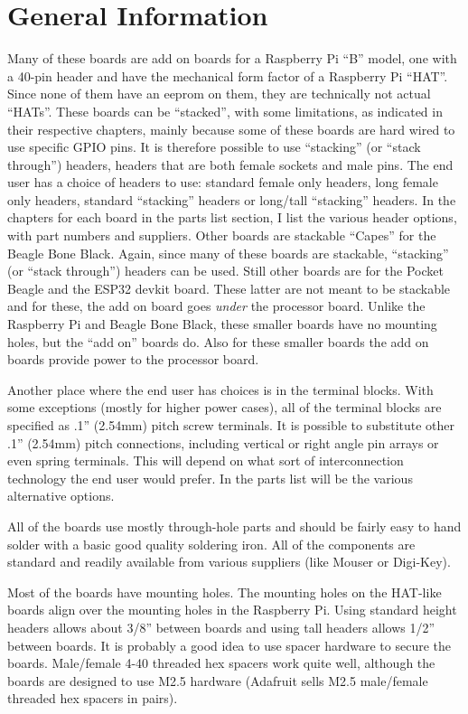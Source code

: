 \documentclass[12pt,notitlepage,twoside]{book}
\begin{document}
\cleardoublepage
{}
\chapter{General Information}

Many of these boards are add on boards for a Raspberry Pi ``B'' model, 
one with a 40-pin header and have the mechanical form factor of a Raspberry Pi 
``HAT''.  Since none of them have an eeprom on them, they are technically not 
actual ``HATs''.  These boards can be ``stacked'', with some limitations, as 
indicated in their respective chapters, mainly because some of these boards 
are hard wired to use specific GPIO pins.  It is therefore possible to use 
``stacking'' (or ``stack through'') headers, headers that are both female 
sockets and male pins.  The end user has a choice of headers to use: standard 
female only headers, long female only headers, standard ``stacking'' headers 
or long/tall ``stacking'' headers.  In the chapters for each board in the 
parts list section, I list the various header options, with part numbers and 
suppliers.  Other boards are stackable ``Capes'' for the Beagle Bone Black. 
Again, since many of these boards are stackable, ``stacking'' (or ``stack 
through'') headers can be used.  Still other boards are for the Pocket Beagle 
and the ESP32 devkit board.  These latter are not meant to be stackable and 
for these, the add on board goes \textit{under} the processor board.  Unlike 
the Raspberry Pi and Beagle Bone Black, these smaller boards have no mounting 
holes, but the ``add on'' boards do.  Also for these smaller boards the add 
on boards provide power to the processor board.

Another place where the end user has choices is in the terminal blocks.  With 
some exceptions (mostly for higher power cases), all of the terminal blocks 
are specified as .1'' (2.54mm) pitch screw terminals.  It is possible to 
substitute other .1'' (2.54mm) pitch connections, including vertical or right 
angle pin arrays or even spring terminals.  This will depend on what sort of 
interconnection technology the end user would prefer.  In the parts list will 
be the various alternative options.

All of the boards use mostly through-hole parts and should be fairly easy to
hand solder with a basic good quality soldering iron. All of the components
are standard and readily available from various suppliers (like Mouser or
Digi-Key).

Most of the boards have mounting holes.  The mounting holes on the HAT-like 
boards align over the mounting holes in the Raspberry Pi.  Using standard 
height headers allows about 3/8'' between boards and using tall headers allows 
1/2'' between boards.  It is probably a good idea to use spacer hardware to 
secure the boards.  Male/female 4-40 threaded hex spacers work quite well, 
although the boards are designed to use M2.5 hardware (Adafruit sells M2.5 
male/female threaded hex spacers in pairs).








\cleardoublepage
%
%
\cleardoublepage
\printindex
\end{document}
